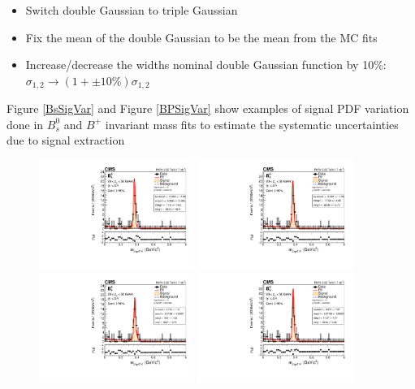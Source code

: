 \begin{itemize}
\item Switch double Gaussian to triple Gaussian
\item Fix the mean of the double Gaussian to be the mean from the MC fits
\item Increase/decrease the widths nominal double Gaussian function by 10\%: $\sigma_{1,2} \rightarrow (1 + \pm 10\%) \sigma_{1,2}$
\end{itemize}

Figure \ref{BsSigVar} and Figure \ref{BPSigVar} show examples of signal PDF variation done in $B^0_s$ and $B^+$ invariant mass fits to estimate the systematic uncertainties due to signal extraction


\begin{figure}[hbtp]
\begin{center}
\includegraphics[width=0.45\textwidth]{Figures/Chapter5/data_PbPb_1_BptNew_2050_doubly0_0_90_signal_3gaussEffInfoTreeFit.pdf}
\includegraphics[width=0.45\textwidth]{Figures/Chapter5/data_PbPb_1_BptNew_2050_doubly0_0_90_signal_fixedEffInfoTreeFit.pdf}
\includegraphics[width=0.45\textwidth]{Figures/Chapter5/data_PbPb_1_BptNew_2050_doubly0_0_90_signal_scal+EffInfoTreeFit.pdf}
\includegraphics[width=0.45\textwidth]{Figures/Chapter5/data_PbPb_1_BptNew_2050_doubly0_0_90_signal_scal-EffInfoTreeFit.pdf}

\end{center}
\end{figure}

